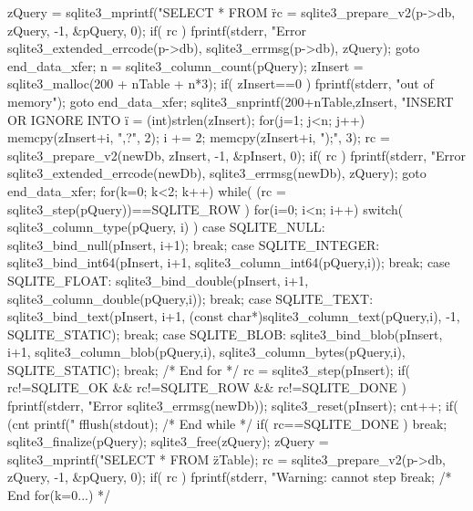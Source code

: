 \begin{Codex}[label=shell.c,numbers=left]
{{  zQuery = sqlite3_mprintf("SELECT * FROM \"%
  rc = sqlite3_prepare_v2(p->db, zQuery, -1, &pQuery, 0);
  if( rc ){
    fprintf(stderr, "Error %
            sqlite3_extended_errcode(p->db), sqlite3_errmsg(p->db),
            zQuery);
    goto end_data_xfer;
  }
  n = sqlite3_column_count(pQuery);
  zInsert = sqlite3_malloc(200 + nTable + n*3);
  if( zInsert==0 ){
    fprintf(stderr, "out of memory\n");
    goto end_data_xfer;
  }
  sqlite3_snprintf(200+nTable,zInsert,
                   "INSERT OR IGNORE INTO \"%
  i = (int)strlen(zInsert);
  for(j=1; j<n; j++){
    memcpy(zInsert+i, ",?", 2);
    i += 2;
  }
  memcpy(zInsert+i, ");", 3);
  rc = sqlite3_prepare_v2(newDb, zInsert, -1, &pInsert, 0);
  if( rc ){
    fprintf(stderr, "Error %
            sqlite3_extended_errcode(newDb), sqlite3_errmsg(newDb),
            zQuery);
    goto end_data_xfer;
  }
  for(k=0; k<2; k++){
    while( (rc = sqlite3_step(pQuery))==SQLITE_ROW ){
      for(i=0; i<n; i++){
        switch( sqlite3_column_type(pQuery, i) ){
          case SQLITE_NULL: {
            sqlite3_bind_null(pInsert, i+1);
            break;
          }
          case SQLITE_INTEGER: {
            sqlite3_bind_int64(pInsert, i+1, sqlite3_column_int64(pQuery,i));
            break;
          }
          case SQLITE_FLOAT: {
            sqlite3_bind_double(pInsert, i+1, sqlite3_column_double(pQuery,i));
            break;
          }
          case SQLITE_TEXT: {
            sqlite3_bind_text(pInsert, i+1,
                             (const char*)sqlite3_column_text(pQuery,i),
                             -1, SQLITE_STATIC);
            break;
          }
          case SQLITE_BLOB: {
            sqlite3_bind_blob(pInsert, i+1, sqlite3_column_blob(pQuery,i),
                                            sqlite3_column_bytes(pQuery,i),
                                            SQLITE_STATIC);
            break;
          }
        }
      } /* End for */
      rc = sqlite3_step(pInsert);
      if( rc!=SQLITE_OK && rc!=SQLITE_ROW && rc!=SQLITE_DONE ){
        fprintf(stderr, "Error %
                        sqlite3_errmsg(newDb));
      }
      sqlite3_reset(pInsert);
      cnt++;
      if( (cnt%
        printf("%
        fflush(stdout);
      }
    } /* End while */
    if( rc==SQLITE_DONE ) break;
    sqlite3_finalize(pQuery);
    sqlite3_free(zQuery);
    zQuery = sqlite3_mprintf("SELECT * FROM \"%
                             zTable);
    rc = sqlite3_prepare_v2(p->db, zQuery, -1, &pQuery, 0);
    if( rc ){
      fprintf(stderr, "Warning: cannot step \"%
      break;
    }
  } /* End for(k=0...) */

}
\end{Codex}
